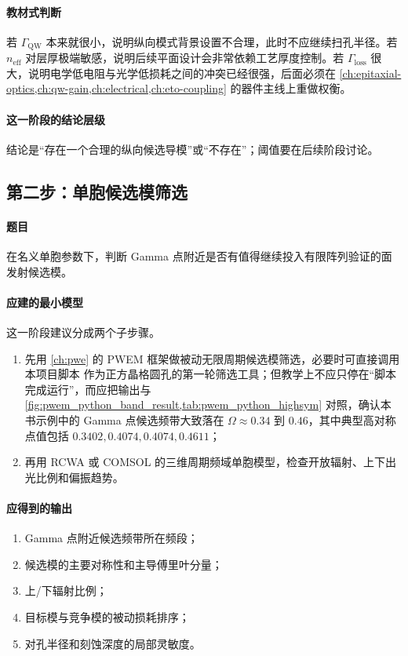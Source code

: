 \paragraph{教材式判断}
若 $\Gamma_{\mathrm{QW}}$ 本来就很小，说明纵向模式背景设置不合理，此时不应继续扫孔半径。若 $n_{\mathrm{eff}}$ 对层厚极端敏感，说明后续平面设计会非常依赖工艺厚度控制。若 $\Gamma_{\mathrm{loss}}$ 很大，说明电学低电阻与光学低损耗之间的冲突已经很强，后面必须在 \cref{ch:epitaxial-optics,ch:qw-gain,ch:electrical,ch:eto-coupling} 的器件主线上重做权衡。

\paragraph{这一阶段的结论层级}
结论是“存在一个合理的纵向候选导模”或“不存在”；阈值要在后续阶段讨论。

\subsection{第二步：单胞候选模筛选}
\paragraph{题目} 在名义单胞参数下，判断 Gamma 点附近是否有值得继续投入有限阵列验证的面发射候选模。

\paragraph{应建的最小模型}
这一阶段建议分成两个子步骤。
\begin{enumerate}
  \item 先用 \cref{ch:pwe} 的 PWEM 框架做被动无限周期候选模筛选，必要时可直接调用本项目脚本  作为正方晶格圆孔的第一轮筛选工具；但教学上不应只停在“脚本完成运行”，而应把输出与 \cref{fig:pwem_python_band_result,tab:pwem_python_highsym} 对照，确认本书示例中的 Gamma 点候选频带大致落在 $\Omega\approx 0.34$ 到 $0.46$，其中典型高对称点值包括 $0.3402,0.4074,0.4074,0.4611$；
  \item 再用 RCWA 或 COMSOL 的三维周期频域单胞模型，检查开放辐射、上下出光比例和偏振趋势。
\end{enumerate}

\paragraph{应得到的输出}
\begin{enumerate}
  \item Gamma 点附近候选频带所在频段；
  \item 候选模的主要对称性和主导傅里叶分量；
  \item 上/下辐射比例；
  \item 目标模与竞争模的被动损耗排序；
  \item 对孔半径和刻蚀深度的局部灵敏度。
\end{enumerate}

